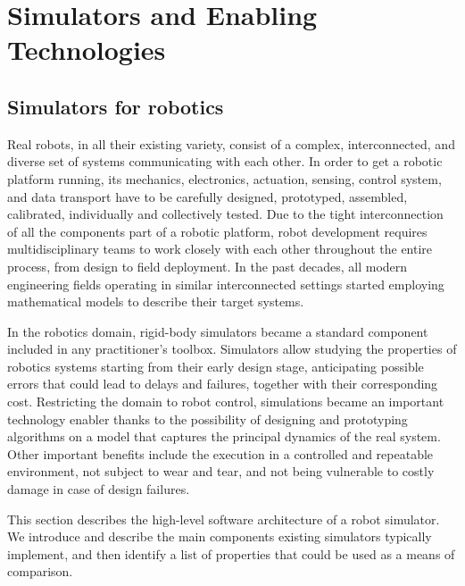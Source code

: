 \chapter{Simulators and Enabling Technologies}
\label{ch:introduction}

\section{Simulators for robotics}

Real robots, in all their existing variety, consist of a complex, interconnected, and diverse set of systems communicating with each other.
In order to get a robotic platform running, its mechanics, electronics, actuation, sensing, control system, and data transport have to be carefully designed, prototyped, assembled, calibrated, individually and collectively tested.
Due to the tight interconnection of all the components part of a robotic platform, robot development requires multidisciplinary teams to work closely with each other throughout the entire process, from design to field deployment.
In the past decades, all modern engineering fields operating in similar interconnected settings started employing mathematical models to describe their target systems.

In the robotics domain, rigid-body simulators became a standard component included in any practitioner's toolbox.
Simulators allow studying the properties of robotics systems starting from their early design stage, anticipating possible errors that could lead to delays and failures, together with their corresponding cost.
Restricting the domain to robot control, simulations became an important technology enabler thanks to the possibility of designing and prototyping algorithms on a model that captures the principal dynamics of the real system.
Other important benefits include the execution in a controlled and repeatable environment, not subject to wear and tear, and not being vulnerable to costly damage in case of design failures.

This section describes the high-level software architecture of a robot simulator.
We introduce and describe the main components existing simulators typically implement, and then identify a list of properties that could be used as a means of comparison.

